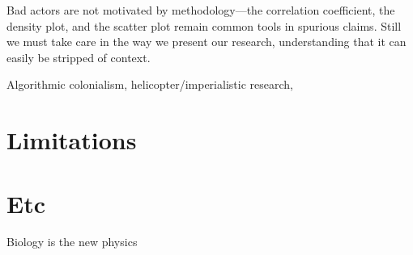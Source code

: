 Bad actors are not motivated by methodology---the correlation coefficient, the density plot, and the scatter plot remain common tools in spurious claims. Still we must take care in the way we present our research, understanding that it can easily be stripped of context.

Algorithmic colonialism, helicopter/imperialistic research, 

\citep{gebru_race_2020}



\section{Limitations}

\section{Etc}

Biology is the new physics \citep{hunter_biology_2010}
